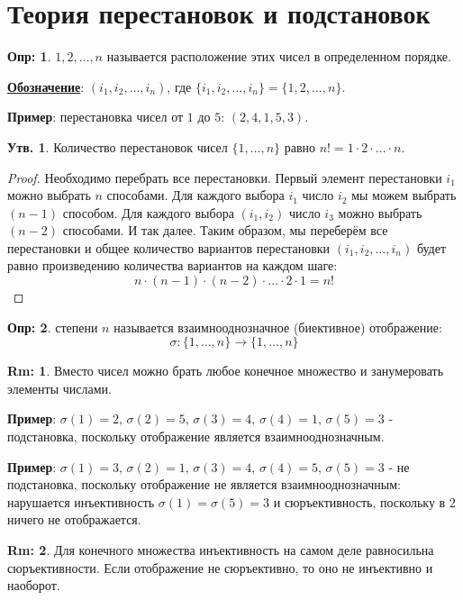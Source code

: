 \documentclass[12pt]{article}
\newcommand{\RN}[1]{%
	\textup{\uppercase\expandafter{\romannumeral#1}}%
}
\theoremstyle{definition}
\newtheorem{defn}{Опр:}
\newtheorem{rem}{Rm:}
\newtheorem{prop}{Утв.}
\begin{document}
\lhead{Алгебра-\RN{1}}
\section*{Теория перестановок и подстановок}
\begin{defn}
	 $1,2, \dotsc, n$ называется расположение этих чисел в определенном порядке.
\end{defn}
\textbf{\uline{Обозначение}}: $(i_1, i_2, \dotsc, i_n)$, где $\{i_1, i_2, \dotsc, i_n\} = \{1,2, \dotsc, n\}$.

\textbf{Пример}: перестановка чисел от $1$ до $5$: $(2,4,1,5,3)$.

\begin{prop}
	Количество перестановок чисел $\{1,\dotsc,n\}$ равно $n! = 1{\cdot}2{\cdot}\dotsc {\cdot} n$.
\end{prop}
\begin{proof}
	Необходимо перебрать все перестановки. Первый элемент перестановки $i_1$ можно выбрать $n$ способами. Для каждого выбора $i_1$ число $i_2$ мы можем выбрать $(n-1)$ способом. Для каждого выбора $(i_1, i_2)$ число $i_3$ можно выбрать $(n-2)$ способами. И так далее. Таким образом, мы переберём все перестановки и общее количество вариантов перестановки $(i_1, i_2, \dotsc, i_n)$ будет равно произведению количества вариантов на каждом шаге:
	$$
		n{\cdot}(n-1){\cdot}(n-2){\cdot}\dotsc{\cdot}2{\cdot}1 = n!
	$$
\end{proof}

\begin{defn}
	 степени $n$ называется взаимнооднозначное (биективное) отображение: 
	$$
		\sigma \colon \{1,\dotsc, n\} \to \{1,\dotsc, n\}
	$$
\end{defn}
\begin{rem}
	Вместо чисел можно брать любое конечное множество и занумеровать элементы числами.
\end{rem}

\textbf{Пример}: $\sigma{(1)} = 2, \, \sigma{(2)} = 5, \, \sigma{(3)} = 4, \, \sigma{(4)} = 1,\, \sigma{(5)} = 3$ - подстановка, поскольку отображение является взаимнооднозначным.

\textbf{Пример}: $\sigma{(1)} = 3, \, \sigma{(2)} = 1, \, \sigma{(3)} = 4, \, \sigma{(4)} = 5,\, \sigma{(5)} = 3$ - не подстановка, поскольку отображение не является взаимнооднозначным: нарушается инъективность $\sigma{(1)} = \sigma{(5)} = 3$ и сюръективность, поскольку в $2$ ничего не отображается.
\begin{rem}
	Для конечного множества инъективность на самом деле равносильна сюръективности. Если отображение не сюръективно, то оно не инъективно и наоборот.
\end{rem}
\end{document}
